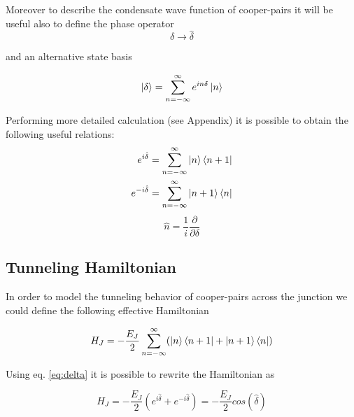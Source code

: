 Moreover to describe the condensate wave function of cooper-pairs  it will  be useful also to define the phase operator 
\begin{equation}
\delta \rightarrow \hat{\delta}
\end{equation} 

and an alternative state basis 

\begin{equation} 
\ket{\delta} =  \sum_{n= -\infty}^{\infty} e^{in\delta}\ket{n}
\end{equation}

Performing more detailed calculation (see Appendix) it is possible to obtain the following useful relations:
\begin{equation}
    \begin{split}\label{eq:delta}
        e^{i\hat{\delta}} = \sum_{n= -\infty}^{\infty} \ket{n}\bra{n+1}\\
        e^{-i\hat{\delta}} = \sum_{n= -\infty}^{\infty} \ket{n+1}\bra{n}\\
    \end{split}
\end{equation}
\begin{equation}
    \label{eq:delta1}
    \hat{n} = \frac{1}{i}\frac{\partial}{\partial\delta}
\end{equation}

\subsection{Tunneling Hamiltonian}
In order to model the tunneling behavior of cooper-pairs across the junction we could define the following effective Hamiltonian

\begin{equation}
    H_J = -\frac{E_J}{2}\sum_{n=-\infty}^{\infty} (\ket{n}\bra{n+1} +\ket{n+1}\bra{n})
\end{equation}

Using eq. \ref{eq:delta} it is possible to rewrite the Hamiltonian as

\begin{equation}
    H_J = -\frac{E_J}{2}(e^{i\hat{\delta}}+e^{-i\hat{\delta}}) = -\frac{E_J}{2}cos(\hat{\delta})
\end{equation}


